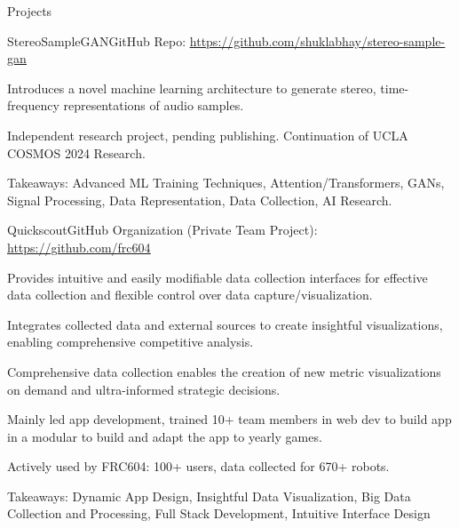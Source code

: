 \documentclass[
  11pt, %
]{public/resume/resume} %
\begin{document}
\begin{rSection}{Projects}

  
  \begin{rSubsection}{StereoSampleGAN}{}{GitHub Repo: \underline{\href{https://github.com/shuklabhay/stereo-sample-gan}{https://github.com/shuklabhay/stereo-sample-gan}}}{}
       
    \item Introduces a novel machine learning architecture to generate stereo, time-frequency representations of audio samples.
        
    \item Independent research project, pending publishing. Continuation of UCLA COSMOS 2024 Research.
        
    \item Takeaways: Advanced ML Training Techniques, Attention/Transformers, GANs, Signal Processing, Data Representation, Data Collection, AI Research.
        
  \end{rSubsection}
      
  \begin{rSubsection}{Quickscout}{}{GitHub Organization (Private Team Project): \underline{\href{https://github.com/frc604}{https://github.com/frc604}}}{}
       
    \item Provides intuitive and easily modifiable data collection interfaces for effective data collection and flexible control over data capture/visualization.
        
    \item Integrates collected data and external sources to create insightful visualizations, enabling comprehensive competitive analysis.
        
    \item Comprehensive data collection enables the creation of new metric visualizations on demand and ultra-informed strategic decisions.
        
    \item Mainly led app development, trained 10+ team members in web dev to build app in a modular to build and adapt the app to yearly games.
        
    \item Actively used by FRC604: 100+ users, data collected for 670+ robots.
        
    \item Takeaways: Dynamic App Design, Insightful Data Visualization, Big Data Collection and Processing, Full Stack Development, Intuitive Interface Design
        

\end{rSubsection}
\end{rSection}
\end{document}
